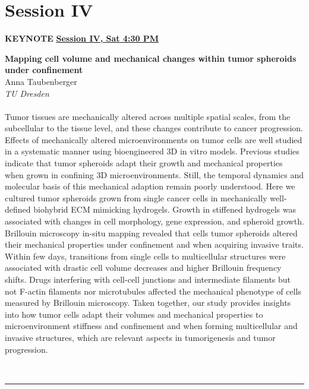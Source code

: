 \documentclass[titlepage,oneside,openany,10pt]{book}
\newenvironment{oralabskeynote}[3]
        {
        \vspace{0.3cm}
        \noindent\textbf{#1}\\%
        #2\\%
        \textit{#3}\\\\%
        }
        {
        \\
        \noindent\rule{15cm}{0.5pt}%
        }
\begin{document}
\newpage

\section*{Session IV}
\label{sec:sessIV}

\vspace{0.5cm}

\begin{shaded}
\noindent\textbf{KEYNOTE} \hfill \textbf{\underline{Session IV, Sat 4:30 PM}}

\begin{oralabskeynote}
	{Mapping cell volume and mechanical changes within tumor spheroids under confinement}
	{Anna Taubenberger}
	{TU Dresden}
	Tumor tissues are mechanically altered across multiple spatial scales,
	from the subcellular to the tissue level, and these changes contribute to
	cancer progression. Effects of mechanically altered microenvironments on
	tumor cells are well studied in a systematic manner using bioengineered
	3D in vitro models. Previous studies indicate that tumor spheroids adapt
	their growth and mechanical properties when grown in confining 3D
	microenvironments. Still, the temporal dynamics and molecular basis of
	this mechanical adaption remain poorly understood. Here we cultured
	tumor spheroids grown from single cancer cells in mechanically well-
	defined biohybrid ECM mimicking hydrogels. Growth in stiffened hydrogels
	was associated with changes in cell morphology, gene expression, and
	spheroid growth. Brillouin microscopy in-situ mapping revealed that cells
	tumor spheroids altered their mechanical properties under confinement
	and when acquiring invasive traits. Within few days, transitions from
	single cells to multicellular structures were associated with drastic cell
	volume decreases and higher Brillouin frequency shifts. Drugs interfering
	with cell-cell junctions and intermediate filaments but not F-actin
	filaments nor microtubules affected the mechanical phenotype of cells
	measured by Brillouin microscopy. Taken together, our study provides
	insights into how tumor cells adapt their volumes and mechanical
	properties to microenvironment stiffness and confinement and when
	forming multicellular and invasive structures, which are relevant aspects
	in tumorigenesis and tumor progression.
	\label{TaubenbergerA}
\end{oralabskeynote}
\end{shaded}
\end{document}
